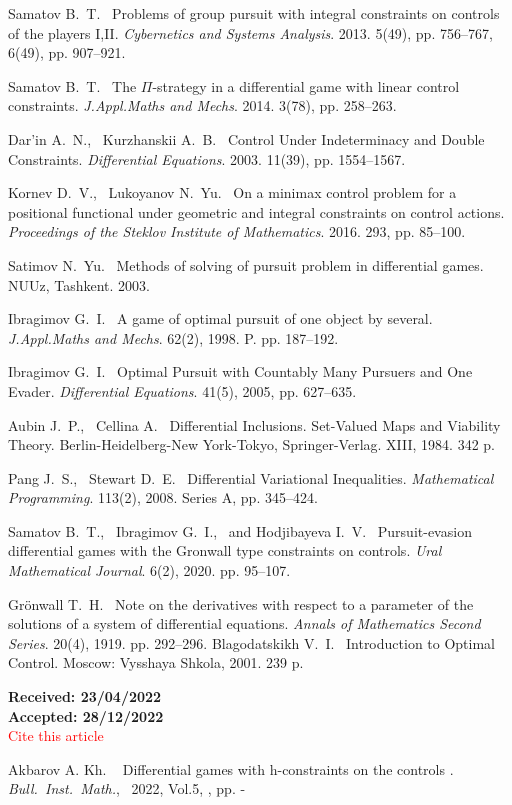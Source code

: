 \documentclass[10 pt]{book}
\begin{document}
\begin{enumerate}
 \textsf{Samatov B.~T.~} Problems of group pursuit with integral constraints on controls of the players I,II. \textit{Cybernetics and Systems Analysis}. 2013. 5(49), pp. 756--767, 6(49), pp. 907--921.

 \textsf{Samatov B.~T.~} The $\Pi$-strategy in a differential game with linear control constraints. \textit{J.Appl.Maths and Mechs}. 2014. 3(78), pp. 258--263.

 \textsf{Dar'in A.~N.,~ Kurzhanskii A.~B.~} Control Under Indeterminacy and Double
 Constraints. \textit{Differential Equations}. 2003. 11(39), pp. 1554--1567.

 \textsf{Kornev D.~V.,~ Lukoyanov N.~Yu.~} On a minimax control problem for a positional functional under
 geometric and integral constraints on control actions. \textit{Proceedings of the Steklov
Institute of Mathematics}. 2016. 293, pp. 85--100.

 \textsf{Satimov N.~Yu.~} Methods of solving of pursuit problem in differential games. NUUz, Tashkent. 2003.

 \textsf{Ibragimov G.~I.~} A game of optimal pursuit of one object by several. \textit{J.Appl.Maths and Mechs}. 62(2), 1998. P. pp. 187--192.

 \textsf{Ibragimov G.~I.~} Optimal Pursuit with Countably Many Pursuers and One Evader. \textit{Differential Equations}. 41(5), 2005, pp. 627--635.

 \textsf{Aubin J.~P.,~ Cellina A.~} Differential Inclusions. Set-Valued
Maps and Viability Theory. Berlin-Heidelberg-New York-Tokyo,
Springer-Verlag. XIII, 1984. 342 p.

 \textsf{Pang J.~S.,~ Stewart D.~E.~} Differential Variational
Inequalities. \textit{Mathematical Programming}.  113(2), 2008. Series A, pp. 345--424.

 \textsf{Samatov B.~T.,~ Ibragimov G.~I.,~ and Hodjibayeva I.~V.~} Pursuit-evasion differential games with the Gronwall
type constraints on controls. \textit{Ural Mathematical Journal}.  6(2), 2020. pp. 95--107.

 \textsf{Gr\"{o}nwall T.~H.~} Note on the derivatives with respect to a
parameter of the solutions of a system of differential equations. \textit{Annals of Mathematics Second Series}.  20(4), 1919. pp. 292--296.
 \textsf{Blagodatskikh V.~I.~} Introduction to Optimal Control. Moscow: Vysshaya Shkola, 2001. 239 p.
\end{enumerate}


\bigskip

\textbf{Received: 23/04/2022}\\

\textbf{Accepted: 28/12/2022}\\


\bigskip
\textcolor{red}{\Large Cite this article}

Akbarov A. Kh.    ~ {Differential games with   h-constraints on the controls }.  \textit{Bull.~Inst.~Math.},~ 2022, Vol.5, , pp. \pageref{firstpage}-\pageref{lastpage}


\label{lastpage}
\end{document}
